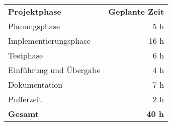 \begin{tabular}{lr}
\rowcolor{heading}\textbf{Projektphase} & \textbf{Geplante Zeit} \\
Planungsphase & 5 h \\
\rowcolor{odd}Implementierungsphase & 16 h \\
Testphase & 6 h \\
\rowcolor{odd}Einführung und Übergabe & 4 h \\
Dokumentation & 7 h\\
\rowcolor{odd}Pufferzeit & 2 h \\
\hline
\hline
\rowcolor{odd}\textbf{Gesamt} & \textbf{40 h} \\
\end{tabular}
